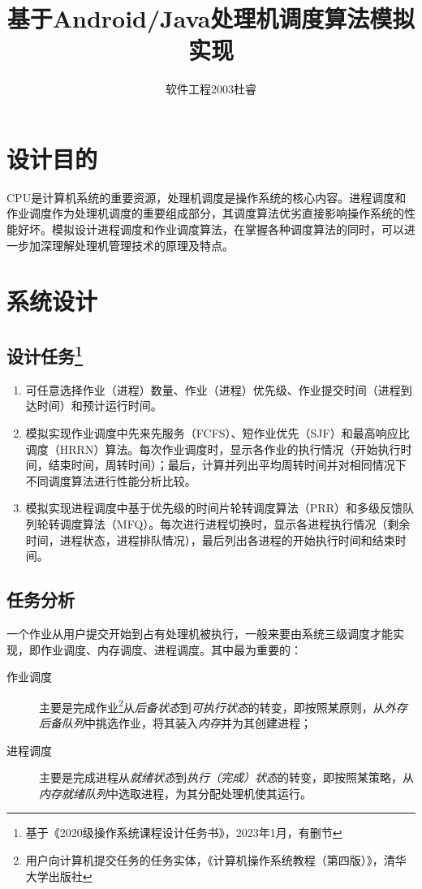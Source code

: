 \documentclass[UTF8]{ctexart}
\title{基于Android/Java处理机调度算法模拟实现}
\author{软件工程2003杜睿}
\date{}
\begin{document}
\tableofcontents
\maketitle

\section{设计目的}
CPU是计算机系统的重要资源，处理机调度是操作系统的核心内容。进程调度和作业调度作为处理机调度的重要组成部分，其调度算法优劣直接影响操作系统的性能好坏。模拟设计进程调度和作业调度算法，在掌握各种调度算法的同时，可以进一步加深理解处理机管理技术的原理及特点。

\section{系统设计}

\subsection{设计任务\footnote{基于《2020级操作系统课程设计任务书》，2023年1月，有删节}}

\begin{enumerate}
    \item 可任意选择作业（进程）数量、作业（进程）优先级、作业提交时间（进程到达时间）和预计运行时间。
    \item 模拟实现作业调度中先来先服务（FCFS）、短作业优先（SJF）和最高响应比调度（HRRN）算法。每次作业调度时，显示各作业的执行情况（开始执行时间，结束时间，周转时间）；最后，计算并列出平均周转时间并对相同情况下不同调度算法进行性能分析比较。
    \item 模拟实现进程调度中基于优先级的时间片轮转调度算法（PRR）和多级反馈队列轮转调度算法（MFQ）。每次进行进程切换时，显示各进程执行情况（剩余时间，进程状态，进程排队情况），最后列出各进程的开始执行时间和结束时间。
\end{enumerate}

\subsection{任务分析}

一个作业从用户提交开始到占有处理机被执行，一般来要由系统三级调度才能实现，即作业调度、内存调度、进程调度。其中最为重要的：
\begin{description}
    \item[作业调度] 主要是完成作业\footnote{用户向计算机提交任务的任务实体，《计算机操作系统教程（第四版）》，清华大学出版社}从\emph{后备状态}到\emph{可执行状态}的转变，即按照某原则，从\emph{外存后备队列}中挑选作业，将其装入\emph{内存}并为其创建进程；
    \item[进程调度] 主要是完成进程从\emph{就绪状态}到\emph{执行（完成）状态}的转变，即按照某策略，从\emph{内存就绪队列}中选取进程，为其分配处理机使其运行。
\end{description}
\end{document}
